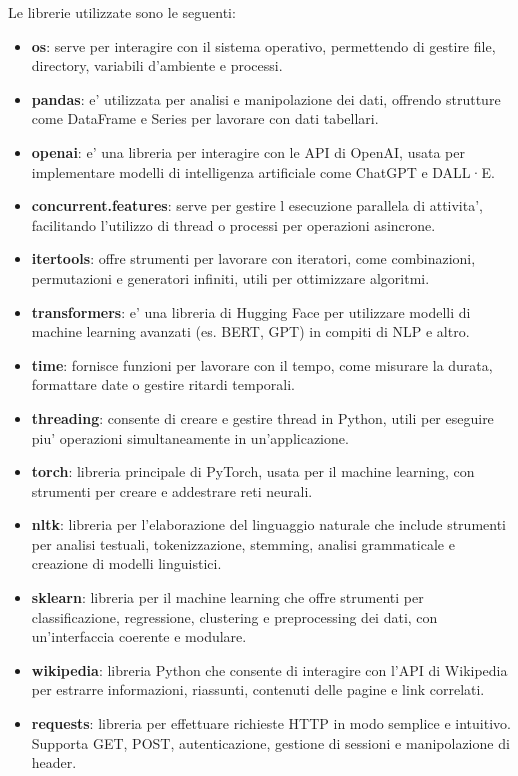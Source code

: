 \documentclass{article}
\begin{document}
Le librerie utilizzate sono le seguenti:
\begin{itemize}
	\item \textbf{os}: serve per interagire con il sistema operativo, permettendo di gestire file, directory, variabili d'ambiente e processi.  
	\item \textbf{pandas}: e' utilizzata per analisi e manipolazione dei dati, offrendo strutture come DataFrame e Series per lavorare con dati tabellari.
	\item \textbf{openai}: e' una libreria per interagire con le API di OpenAI, usata per implementare modelli di intelligenza artificiale come ChatGPT e DALL·E.
	\item \textbf{concurrent.features}: serve per gestire l esecuzione parallela di attivita', facilitando l’utilizzo di thread o processi per operazioni asincrone.  
	\item \textbf{itertools}: offre strumenti per lavorare con iteratori, come combinazioni, permutazioni e generatori infiniti, utili per ottimizzare algoritmi.
	\item \textbf{transformers}: e' una libreria di Hugging Face per utilizzare modelli di machine learning avanzati (es. BERT, GPT) in compiti di NLP e altro.
	\item \textbf{time}: fornisce funzioni per lavorare con il tempo, come misurare la durata, formattare date o gestire ritardi temporali.
	\item \textbf{threading}: consente di creare e gestire thread in Python, utili per eseguire piu' operazioni simultaneamente in un'applicazione.\ 
	\item \textbf{torch}: libreria principale di PyTorch, usata per il machine learning, con strumenti per creare e addestrare reti neurali.
	\item \textbf{nltk}: libreria per l'elaborazione del linguaggio naturale che include strumenti per analisi testuali, tokenizzazione, stemming, analisi grammaticale e creazione di modelli linguistici.
	\item \textbf{sklearn}: libreria per il machine learning che offre strumenti per classificazione, regressione, clustering e preprocessing dei dati, con un'interfaccia coerente e modulare.
	\item \textbf{wikipedia}: libreria Python che consente di interagire con l'API di Wikipedia per estrarre informazioni, riassunti, contenuti delle pagine e link correlati.
	\item \textbf{requests}: libreria per effettuare richieste HTTP in modo semplice e intuitivo. Supporta GET, POST, autenticazione, gestione di sessioni e manipolazione di header.

\end{itemize}
\end{document}
